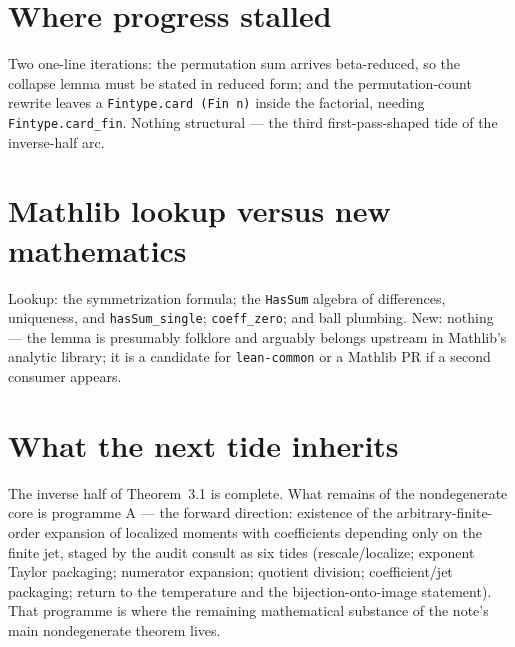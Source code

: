 \documentclass[11pt]{article}
\newcommand{\code}[1]{\texttt{#1}}
\begin{document}
\section{Where progress stalled}

Two one-line iterations: the permutation sum arrives beta-reduced,
so the collapse lemma must be stated in reduced form; and the
permutation-count rewrite leaves a \code{Fintype.card (Fin n)}
inside the factorial, needing \code{Fintype.card\_fin}. Nothing
structural ---
the third first-pass-shaped tide of the inverse-half arc.

\section{Mathlib lookup versus new mathematics}

Lookup: the symmetrization formula; the \code{HasSum} algebra of
differences, uniqueness, and \code{hasSum\_single};
\code{coeff\_zero}; and ball plumbing. New: nothing --- the lemma is
presumably folklore and arguably belongs upstream in Mathlib's
analytic library; it is a candidate for \code{lean-common} or a
Mathlib PR if a second consumer appears.

\section{What the next tide inherits}

The inverse half of Theorem~3.1 is complete. What remains of the
nondegenerate core is programme A --- the forward direction:
existence of the arbitrary-finite-order expansion of localized
moments with coefficients depending only on the finite jet, staged
by the audit consult as six tides (rescale/localize; exponent Taylor
packaging; numerator expansion; quotient division; coefficient/jet
packaging; return to the temperature and the bijection-onto-image
statement). That programme is where the remaining mathematical
substance of the note's main nondegenerate theorem lives.
\end{document}
